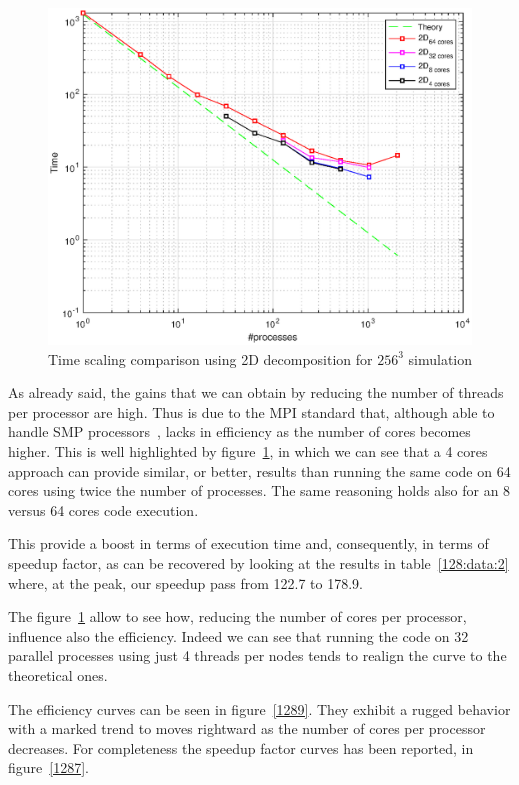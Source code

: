 \begin{figure}
\begin{center}
\includegraphics[scale=0.6]{grafici/1285}
\caption{Time scaling comparison using 2D decomposition for $256^{3}$ simulation}
\label{1285}
\end{center}
\end{figure}

As already said, the gains that we can obtain by reducing the number of threads per processor are high. 
Thus is due to the MPI standard that, although able to handle SMP processors~\cite{smp:processors}, lacks in efficiency as the number of cores becomes higher.
This is well highlighted by figure~\ref{1285}, in which we can see that a 4 cores approach can provide similar, or better, results than running the same code on 64 cores using twice the number of processes. The same reasoning holds also for an 8 versus 64 cores code execution. \par
This provide a boost in terms of execution time and, consequently, in terms of speedup factor, as can be recovered by looking at the results in table~\ref{128:data:2} where, at the peak, our speedup pass from 122.7 to 178.9.\par
The figure~\ref{1285} allow to see how, reducing the number of cores per processor, influence also the efficiency. Indeed we can see that running the code on 32 parallel processes using just 4 threads per nodes tends to realign the curve to the theoretical ones.\par
The efficiency curves can be seen in figure~\ref{1289}. They exhibit a rugged behavior with a marked trend to moves rightward as the number of cores per processor decreases.
For completeness the speedup factor curves has been reported, in figure~\ref{1287}.

